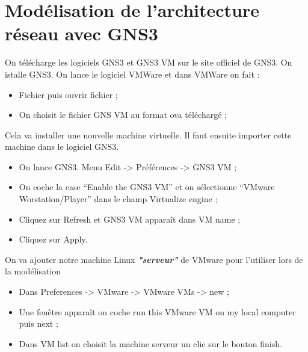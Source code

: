 \documentclass[a4paper,12pt,french]{report} %
\begin{document}
\section{Modélisation de l'architecture réseau avec GNS3}
	On télécharge les logiciels GNS3  et  GNS3 VM sur le site officiel de GNS3. On istalle GNS3.
On lance le logiciel VMWare et dans VMWare on fait :
\begin{itemize}
	\item Fichier puis ouvrir fichier ;
	\item  On choisit le fichier GNS VM au format ova téléchargé ;
\end{itemize}
Cela va installer une nouvelle machine virtuelle. Il faut ensuite importer cette machine dans le logiciel GNS3.
\begin{itemize}
	\item On lance GNS3. Menu Edit -> Préférences -> GNS3 VM ;
	\item On coche la case  “Enable the GNS3 VM” et on sélectionne “VMware Worstation/Player” dans le champ Virtualize engine ;
	\item Cliquez sur Refresh et GNS3 VM apparaît dans VM name ;
	\item Cliquez sur Apply.
\end{itemize}
On va ajouter notre machine Linux \emph{\textbf{"serveur"}} de VMware pour l'utiliser lors de la modélisation
\begin{itemize}
	\item Dans Preferences -> VMware -> VMware VMs -> new ;
	\item Une fenêtre apparaît on coche run this VMware VM on my local computer puis next ;
	\item Dans VM list on choisit la machine serveur un clic sur le bouton finish.
\end{itemize}
\end{document}
